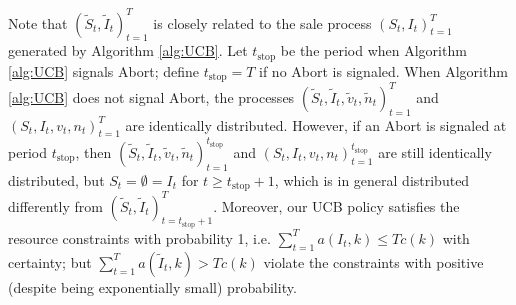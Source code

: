 \documentclass{article}
\theoremstyle{definition}
\begin{document}
Note that $(\tilde{S}_t, \tilde{I}_t)^T_{t=1}$ is closely related to the sale process $(S_t, I_t)^T_{t=1}$ generated by Algorithm \ref{alg:UCB}. Let $t_{\text{stop}}$ be the period when Algorithm \ref{alg:UCB} signals {\sc Abort}; define $t_{\text{stop}} = T$ if no {\sc Abort} is signaled. When Algorithm \ref{alg:UCB} does not signal {\sc Abort}, the processes $(\tilde{S}_t, \tilde{I}_t, \tilde{v}_t, \tilde{n}_t )^T_{t=1}$ and $(S_t, I_t, v_t, n_t)^T_{t=1}$ are identically distributed. However, if an {\sc Abort} is signaled at period $t_{\text{stop}}$, then $(\tilde{S}_t, \tilde{I}_t, \tilde{v}_t, \tilde{n}_t)^{t_{\text{stop}}}_{t=1}$ and $(S_t, I_t, v_t, n_t)^{t_{\text{stop}}}_{t=1}$ are still identically distributed, but $S_t = \emptyset = I_t$ for $t \geq t_{\text{stop}} +1$, which is in general distributed differently from $(\tilde{S}_t, \tilde{I}_t)^T_{t=t_{\text{stop}} + 1}$. Moreover, our UCB policy satisfies the resource constraints with probability 1, i.e. $\sum^T_{t=1}a(I_t, k)\leq T c(k)$ with certainty; but $\sum^T_{t=1}a(\tilde{I}_t, k) > T c(k)$ violate the constraints with positive (despite being exponentially small) probability. 

\end{document}
